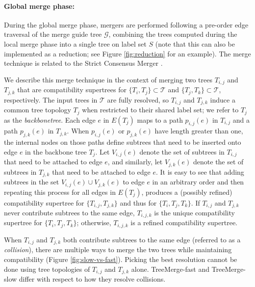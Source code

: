 \paragraph{Global merge phase:} 
During the global merge phase, mergers are performed following a pre-order edge traversal of the merge guide tree $\mathcal{G}$, combining the trees computed during the local merge phase into a single tree on label set $S$ (note that this can also be implemented as a reduction; see Figure \ref{fig:reduction} for an example).
The merge technique is related to the Strict Consensus Merger \cite{warnow2001absolute, swenson2012superfine}.

We describe this merge technique in the context of merging two trees $T_{i,j}$ and $T_{j,k}$ that are compatibility supertrees for $\{T_i, T_j\} \subset \mathcal{T}$ and $\{T_j, T_k\} \subset \mathcal{T}$, respectively.
The input trees in $\mathcal{T}$ are fully resolved, so $T_{i,j}$ and $T_{j,k}$ 
induce a common tree \gls{topology} $T_j$ when restricted to their shared label set; we refer to $T_j$ as the \textit{\gls{backbonetree}}.
Each edge $e$ in $E(T_j)$ maps to a path $p_{i,j}(e)$ in $T_{i,j}$ and a path $p_{j,k}(e)$ in $T_{j,k}$.
When $p_{i,j}(e)$ or $p_{j,k}(e)$ have length greater than one, the internal nodes on those paths define subtrees that need to be inserted onto edge $e$ in the backbone tree $T_j$.
Let $V_{i,j}(e)$ denote the set of subtrees in $T_{i,j}$ that need to be attached to edge $e$, and similarly, let $V_{j,k}(e)$ denote the set of subtrees in $T_{j,k}$ that need to be attached to edge $e$.
It is easy to see that adding subtrees in the set $V_{i,j}(e) \cup V_{j,k}(e)$ to edge $e$ in an arbitrary order and then repeating this process for all edges in $E(T_j)$, produces a (possibly refined) compatibility supertree for $\{T_{i,j}, T_{j,k} \}$ and thus for $\{ T_i, T_j, T_k \}$.
If $T_{i,j}$ and $T_{j,k}$ never contribute subtrees to the same edge, $T_{i,j,k}$ is the unique compatibility supertree for $\{ T_i, T_j, T_k \}$; otherwise, $T_{i,j,k}$ is a refined compatibility supertree.

When $T_{i,j}$ and $T_{j,k}$ both contribute subtrees to the same edge (referred to as a \textit{\gls{collision}}), there are multiple ways to merge the two trees while maintaining compatibility (Figure \ref{fig:slow-vs-fast}).
Picking the best resolution cannot be done using tree topologies of $T_{i,j}$ and $T_{j,k}$ alone.
TreeMerge-fast and TreeMerge-slow differ with respect to how they resolve collisions.

